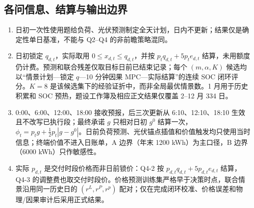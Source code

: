 \subsection{各问信息、结算与输出边界}\label{sec:assumptions-q1}
\begin{enumerate}[label=Q\arabic*:,leftmargin=3.0em,labelsep=0.4em,itemsep=0.3em]
\item 日初一次性使用题给负荷、光伏预测制定全天计划，日内不更新；结果仅是确定性单日基准，不能与 Q2--Q4 的非前瞻策略混同。
\item 日初锁定 $q_{d,t}$，实际取用 $0\le x_{d,t}\le q_{d,t}$，并按 $p_tq_{d,t}+5p_te_{d,t}$ 结算，未用额度仍计费。预测和联合残差仅取目标日前已结束记录；每个 $(m,\alpha,K)$ 候选均以“情景计划—锁定 $q$—10 分钟因果 MPC—实际结算”的连续 SOC 闭环评分。$K=8$ 是该候选集下的经验证折中，而非全局最优情景数。1 月用于历史积累和 SOC 预热，题设工作簿及相应正文结果仅覆盖 2--12 月 334 日。
\item 0:00、6:00、12:00、18:00 接收预报，后三次更新从 6:10、12:10、18:10 生效且不改写已执行段；最终承诺 $g$ 只相对日初 $g^0$ 结算一次，$\phi_t=p_tg+\tfrac12p_t|g-g^0|$。日前负荷预测、光伏锚点插值和价值触发均只使用当时信息；终端价值不进入日账单，A 边界（年末 1200 kWh）为主口径，B 边界（6000 kWh）只作敏感性。
\item 实际 $p_{d,t}$ 是交付时段价格而非日前锁价：Q4-2 按 $p_{d,t}q_{d,t}+5p_{d,t}e_{d,t}$ 结算，Q4-3 的调整费也取交付时段价。价格预测训练集严格早于决策时点，联合情景沿用同一历史日的 $(r^L,r^P,r^p)$ 配对；仅在完成闭环校准、价格误差和物理/因果审计后采用正式结果。
\end{enumerate}
